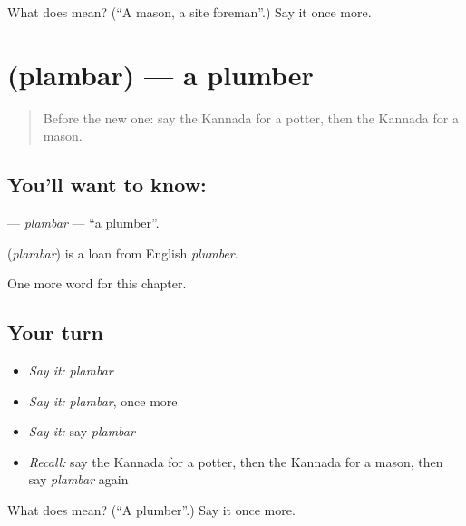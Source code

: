 \begin{tcolorbox}[breakable,colback=teal!4,colframe=teal!35!black,title={Before you move on}]
What does  mean? (\textquotedblleft{}A mason, a site foreman\textquotedblright{}.) Say it once more.
\end{tcolorbox}
\section[\texorpdfstring{\kn{ಪ್ಲಂಬರ್} (plambar)}{ಪ್ಲಂಬರ್ (plambar)}]{ (plambar) — a plumber}

\label{lesson:KA-C306-plambar}



\begin{quote}
Before the new one: say the Kannada for a potter, then the Kannada for a mason.
\end{quote}

\subsection*{You'll want to know: }
\textbf{} — \emph{plambar} — \textquotedblleft{}a plumber\textquotedblright{}.

\begin{cousinweb}
\textbf{} (\emph{plambar}) is a loan from English \emph{plumber}.
\end{cousinweb}

\begin{grammarlens}[title={What you've built}]
One more word for this chapter.
\end{grammarlens}

\subsection*{Your turn}
\begin{itemize}
\raggedright
  \item \emph{Say it:} \emph{plambar}
  \item \emph{Say it:} \emph{plambar}, once more
  \item \emph{Say it:} say \emph{plambar}
  \item \emph{Recall:} say the Kannada for a potter, then the Kannada for a mason, then say \emph{plambar} again
\end{itemize}

\begin{tcolorbox}[breakable,colback=teal!4,colframe=teal!35!black,title={Before you move on}]
What does  mean? (\textquotedblleft{}A plumber\textquotedblright{}.) Say it once more.
\end{tcolorbox}

